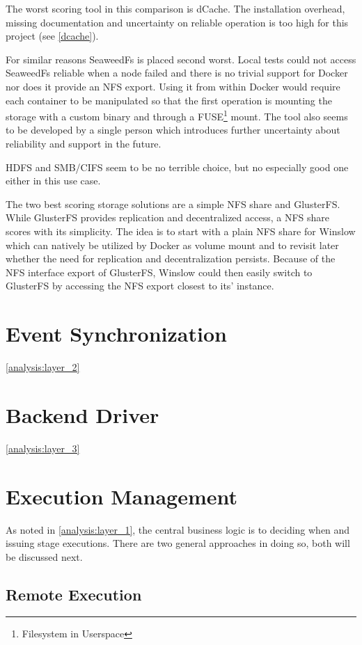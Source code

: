 The worst scoring tool in this comparison is dCache.
The installation overhead, missing documentation and uncertainty on reliable operation is too high for this project (see \autoref{dcache}).

For similar reasons SeaweedFs is placed second worst.
Local tests could not access SeaweedFs reliable when a node failed and there is no trivial support for Docker nor does it provide an NFS export.
Using it from within Docker would require each container to be manipulated so that the first operation is mounting the storage with a custom binary and through a FUSE\footnote{Filesystem in Userspace} mount.
The tool also seems to be developed by a single person which introduces further uncertainty about reliability and support in the future.

HDFS and SMB/CIFS seem to be no terrible choice, but no especially good one either in this use case.

The two best scoring storage solutions are a simple NFS share and GlusterFS.
While GlusterFS provides replication and decentralized access, a NFS share scores with its simplicity.
The idea is to start with a plain NFS share for Winslow which can natively be utilized by Docker as volume mount and to revisit later whether the need for replication and decentralization persists.
Because of the NFS interface export of GlusterFS, Winslow could then easily switch to GlusterFS by accessing the NFS export closest to its' instance.

\section{Event Synchronization}
\autoref{analysis:layer_2}

\section{Backend Driver}

 \autoref{analysis:layer_3}


\section{Execution Management}

As noted in \autoref{analysis:layer_1}, the central business logic is to deciding when and issuing stage executions.
There are two general approaches in doing so, both will be discussed next.

\subsection{Remote Execution}

